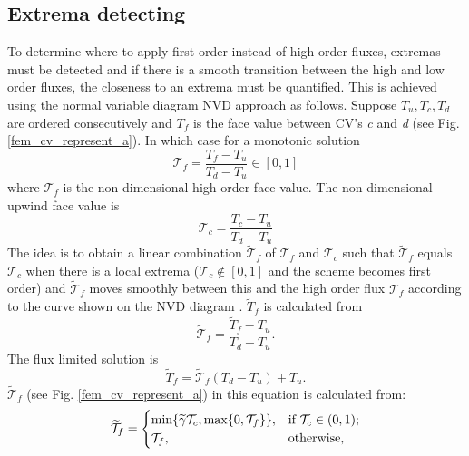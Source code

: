 
\subsection{Extrema detecting}

To determine where to apply first order instead of high order fluxes, extremas must be detected and if there is a smooth transition between the high and low order fluxes, the closeness to an extrema must be quantified. This is achieved using the normal variable diagram NVD approach  as follows. Suppose $T_{u}, T_{c}, T_{d}$ are ordered consecutively and $T_{f}$ is the face value between CV's \textit{c} and \textit{d} (see Fig. \ref{fem_cv_represent_a}). In which case for a monotonic solution
\begin{equation}
\mathcal{T}_{f} = \frac{T_{f} - T_{u}}{T_{d} - T_{u}}  \in [0,1]
\label{p4a}
\end{equation}
where $\mathcal{T}_{f}$ is the non-dimensional high order face value.  The non-dimensional upwind face value is
\begin{equation}
\mathcal{T}_{c} = \frac{T_{c} - T_{u}}{T_{d} - T_{u}}
\label{p4b}
\end{equation}
The idea is to obtain a linear combination $\widetilde{\mathcal{T}}_{f}$ of $\mathcal{T}_{f}$ and $\mathcal{T}_{c}$ such that $\widetilde{\mathcal{T}}_{f}$ equals $\mathcal{T}_{c}$ when there is a local extrema ($\mathcal{T}_{c} \notin [0,1]$ and the scheme becomes first order) and $\widetilde{\mathcal{T}}_{f}$ moves smoothly between this and the high order flux $\mathcal{T}_{f}$ according to the curve shown on the NVD diagram \citep[see][]{gomes_2008}. $\widetilde{T}_{f}$ is calculated from
\begin{equation}
\widetilde{\mathcal{T}}_{f} = \frac{\widetilde{T}_{f} - T_{u}}{T_{d} - T_{u}}.
\label{2.1a}
\end{equation}
The flux limited solution is
\begin{equation}
\widetilde{T}_{f} = \widetilde{\mathcal{T}}_{f} (T_{d} - T_{u}) + T_{u}.
\label{2.1b}
\end{equation}
$\widetilde{\mathcal{T}}_{f}$ (see Fig. \ref{fem_cv_represent_a}) in this equation is calculated from:%
\begin{equation}
\widetilde{\mathcal{T}}_{f} =
  \begin{cases}
    \min \{ \widetilde{\gamma} {\cal T}_{c}, \max \{ 0, {\cal T}_f\} \}, & \text{if} \
    \mathcal{T}_{c} \in (0,1); \\
    \mathcal{T}_{f},  & \text{otherwise},
  \end{cases}
\label{2.1c}
\end{equation}
